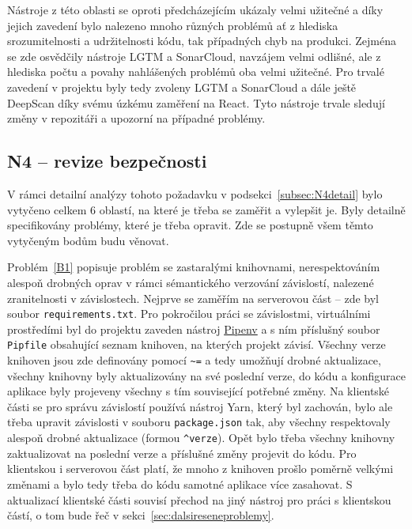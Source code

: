 Nástroje z této oblasti se oproti předcházejícím ukázaly velmi užitečné a díky jejich zavedení bylo nalezeno mnoho různých problémů ať z hlediska srozumitelnosti a udržitelnosti kódu, tak případných chyb na produkci. Zejména se zde osvědčily nástroje LGTM a SonarCloud, navzájem velmi odlišné, ale z hlediska počtu a povahy nahlášených problémů oba velmi užitečné. Pro trvalé zavedení v projektu byly tedy zvoleny LGTM a SonarCloud a dále ještě DeepScan díky svému úzkému zaměření na React. Tyto nástroje trvale sledují změny v repozitáři a upozorní na případné problémy.

\subsection{N4 -- revize bezpečnosti}\label{subsec:N4implementace}

V rámci detailní analýzy tohoto požadavku v podsekci~\ref{subsec:N4detail} bylo vytyčeno celkem 6 oblastí, na které je třeba se zaměřit a vylepšit je. Byly detailně specifikovány problémy, které je třeba opravit. Zde se postupně všem těmto vytyčeným bodům budu věnovat.

Problém~\ref{B1} popisuje problém se zastaralými knihovnami, nerespektováním alespoň drobných oprav v rámci sémantického verzování závislostí, nalezené zranitelnosti v závislostech. Nejprve se zaměřím na serverovou část -- zde byl soubor \verb|requirements.txt|. Pro pokročilou práci se závislostmi, virtuálními prostředími \cite{pipenv-realpython} byl do projektu zaveden nástroj \href{https://pipenv.pypa.io/en/latest/}{Pipenv} a s ním příslušný soubor \verb|Pipfile| obsahující seznam knihoven, na kterých projekt závisí. Všechny verze knihoven jsou zde definovány pomocí \verb|~=| a tedy umožňují drobné aktualizace, všechny knihovny byly aktualizovány na své poslední verze, do kódu a konfigurace aplikace byly projeveny všechny s tím související potřebné změny. Na klientské části se pro správu závislostí používá nástroj Yarn, který byl zachován, bylo ale třeba upravit závislosti v souboru \verb|package.json| tak, aby všechny respektovaly alespoň drobné aktualizace (formou \verb|^verze|). Opět bylo třeba všechny knihovny zaktualizovat na poslední verze a příslušné změny projevit do kódu. Pro klientskou i serverovou část platí, že mnoho z knihoven prošlo poměrně velkými změnami a bylo tedy třeba do kódu samotné aplikace více zasahovat. S aktualizací klientské části souvisí přechod na jiný nástroj pro práci s klientskou částí, o tom bude řeč v sekci~\ref{sec:dalsireseneproblemy}.

